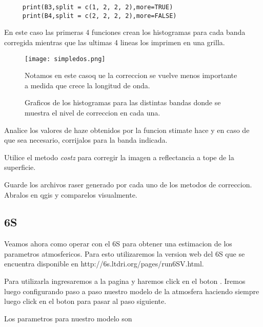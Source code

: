 \begin{exa}
\begin{lstlisting}
     print(B3,split = c(1, 2, 2, 2),more=TRUE)
     print(B4,split = c(2, 2, 2, 2),more=FALSE)
    \end{lstlisting}
    En este caso las primeras 4 funciones crean los histogramas para cada banda
    corregida mientras que las ultimas 4 lineas los imprimen en una grilla.
    \begin{figure}
    \begin{center}
        \texttt{[image: simpledos.png]}
    \end{center}
    \caption{Graficos de los histogramas para las distintas bandas donde se
        muestra el nivel de correccion en cada una.}
    \label{fig:simpledos.png}
    Notamos en este casoq ue la correccion se vuelve menos importante a medida
        que crece la longitud de onda.
    \end{figure}
    
\end{exa}
\begin{act}
    Analice los valores de haze obtenidos por la funcion stimate hace y en caso
    de que sea necesario, corrijalos para la banda indicada.
\end{act}

\begin{act}
    Utilice el metodo \emph{costz} para corregir la imagen a reflectancia a tope
    de la superficie.
\end{act}

\begin{act}
    Guarde los archivos raser generado por cada uno de los metodos de
    correccion. Abralos en qgis y comparelos visualmente.    
\end{act}


\subsection{6S}
\label{sub:corr:6S}

Veamos ahora como operar con el 6S para obtener una estimacion de los parametros
atmosfericos. Para esto utilizaremos la version web del 6S que se encuentra
disponible en http://6s.ltdri.org/pages/run6SV.html.

Para utilizarla ingresaremos a la pagina y haremos click en el boton
. Iremos luego configurando paso a paso nuestro modelo de la
atmosfera haciendo siempre luego click en el boton  para
pasar al paso siguiente.

Los parametros para nuestro modelo son


